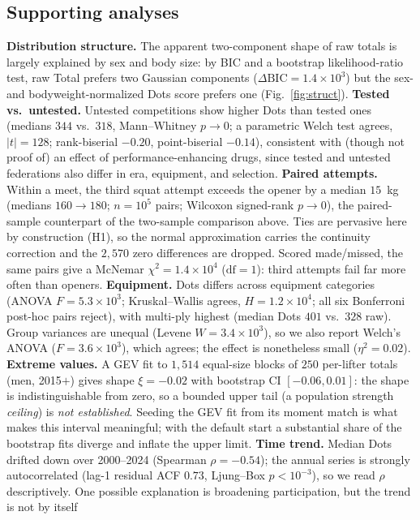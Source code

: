 \documentclass[conference]{IEEEtran}
\begin{document}
\subsection{Supporting analyses}
\textbf{Distribution structure.} The apparent two-component shape of raw totals is
largely explained by sex and body size: by BIC and a bootstrap likelihood-ratio
test, raw Total prefers two Gaussian components ($\Delta\mathrm{BIC}=1.4\times10^3$)
but the sex- and bodyweight-normalized Dots score prefers one (Fig.~\ref{fig:struct}). \textbf{Tested vs.\ untested.} Untested competitions show
higher Dots than tested ones (medians $344$ vs.\ $318$, Mann--Whitney $p\!\to\!0$;
a parametric Welch test agrees, $|t|=128$; rank-biserial $-0.20$, point-biserial $-0.14$), consistent with (though not proof of) an effect of
performance-enhancing drugs, since tested and untested federations also differ in
era, equipment, and selection. \textbf{Paired attempts.} Within a meet, the third
squat attempt exceeds the opener by a median $15$~kg (medians $160\to180$;
$n=10^5$ pairs; Wilcoxon signed-rank $p\!\to\!0$), the paired-sample counterpart
of the two-sample comparison above. Ties are pervasive here by construction (H1), so the normal approximation carries the continuity correction and the $2{,}570$ zero differences are dropped. Scored made/missed, the same pairs give a McNemar $\chi^2=1.4\times10^4$ ($\mathrm{df}=1$): third attempts fail far more often than openers. \textbf{Equipment.} Dots differs across
equipment categories (ANOVA $F=5.3\times10^3$; Kruskal--Wallis agrees,
$H=1.2\times10^4$; all six Bonferroni post-hoc pairs reject), with multi-ply
highest (median Dots $401$ vs.\ $328$ raw). Group variances are unequal (Levene $W=3.4\times10^3$), so we also report Welch's ANOVA ($F=3.6\times10^3$), which agrees; the effect is nonetheless small ($\eta^2=0.02$). \textbf{Extreme values.} A GEV fit to $1{,}514$ equal-size blocks of $250$
per-lifter totals (men, 2015$+$) gives shape $\xi=-0.02$ with bootstrap CI
$[-0.06,0.01]$: the shape is indistinguishable from zero, so a bounded upper tail
(a population strength \emph{ceiling}) is \emph{not established}. Seeding the GEV
fit from its moment match is what makes this interval meaningful; with the default
start a substantial share of the bootstrap fits diverge and inflate the upper limit. \textbf{Time
trend.} Median Dots drifted down over 2000--2024 (Spearman $\rho=-0.54$); the annual series is strongly autocorrelated (lag-1 residual ACF $0.73$, Ljung--Box $p<10^{-3}$), so we read $\rho$ descriptively. One
possible explanation is broadening participation, but the trend is not by itself
\end{document}
